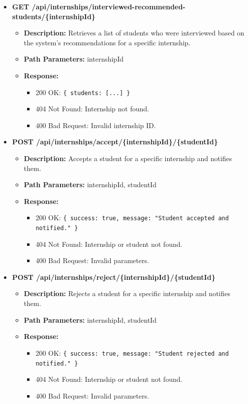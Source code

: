 \begin{itemize}
    \item \textbf{GET /api/internships/interviewed-recommended-students/\{internshipId\}}  
    \begin{itemize}
        \item \textbf{Description:} Retrieves a list of students who were interviewed based on the system's recommendations for a specific internship.
        \item \textbf{Path Parameters:} internshipId  
        \item \textbf{Response:}
        \begin{itemize}
            \item 200 OK: \texttt{\{ students: [...] \}}
            \item 404 Not Found: Internship not found.
            \item 400 Bad Request: Invalid internship ID.
        \end{itemize}
    \end{itemize}

    \item \textbf{POST /api/internships/accept/\{internshipId\}/\{studentId\}}  
    \begin{itemize}
        \item \textbf{Description:} Accepts a student for a specific internship and notifies them.
        \item \textbf{Path Parameters:} internshipId, studentId  
        \item \textbf{Response:}
        \begin{itemize}
            \item 200 OK: \texttt{\{ success: true, message: "Student accepted and notified." \}}
            \item 404 Not Found: Internship or student not found.
            \item 400 Bad Request: Invalid parameters.
        \end{itemize}
    \end{itemize}

    \item \textbf{POST /api/internships/reject/\{internshipId\}/\{studentId\}}  
    \begin{itemize}
        \item \textbf{Description:} Rejects a student for a specific internship and notifies them.
        \item \textbf{Path Parameters:} internshipId, studentId  
        \item \textbf{Response:}
        \begin{itemize}
            \item 200 OK: \texttt{\{ success: true, message: "Student rejected and notified." \}}
            \item 404 Not Found: Internship or student not found.
            \item 400 Bad Request: Invalid parameters.
        \end{itemize}
    \end{itemize}


\end{itemize}
